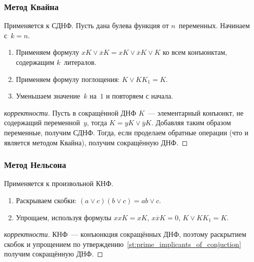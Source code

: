 \subsubsection{Метод Квайна}
Применяется к СДНФ.
Пусть дана булева функция от $n$~переменных.
Начинаем с~$k = n$.
\begin{enumerate}
	\item Применяем формулу $x K \lor \overline x K	= x K \lor \overline x K \lor K$ ко всем конъюнктам, содержащим $k$~литералов.
	\item Применяем формулу поглощения: $K \lor K K_1 = K$.
	\item Уменьшаем значение~$k$ на~$1$ и повторяем с начала.
\end{enumerate}
\begin{proof}[корректности]
Пусть в сокращённой ДНФ $K$~--- элементарный конъюнкт, не содержащий переменной~$y$, тогда $K = y K \lor \overline y K$.
Добавляя таким образом переменные, получим СДНФ.
Тогда, если проделаем обратные операции (что и является методом Квайна), получим сокращённую ДНФ.
\end{proof}

\subsubsection{Метод Нельсона}
Применяется к произвольной КНФ.
\begin{enumerate}
	\item Раскрываем скобки: $(a \lor c)(b \lor c) = ab \lor c$.
	\item Упрощаем, используя формулы $xxK = xK$, $x \overline x K = 0$, $K \lor K K_1 = K$.
\end{enumerate}
\begin{proof}[корректности]
КНФ~--- конъюнкция сокращённых ДНФ, поэтому раскрытием скобок и упрощением по утверждению~\ref*{st:prime_implicants_of_conjuction} получим сокращённую ДНФ.
\end{proof}
